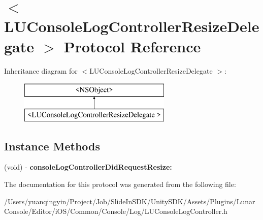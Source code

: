 \hypertarget{protocol_l_u_console_log_controller_resize_delegate_01-p}{}\section{$<$L\+U\+Console\+Log\+Controller\+Resize\+Delegate $>$ Protocol Reference}
\label{protocol_l_u_console_log_controller_resize_delegate_01-p}
Inheritance diagram for $<$L\+U\+Console\+Log\+Controller\+Resize\+Delegate $>$\+:\begin{figure}[H]
\begin{center}
\leavevmode
\includegraphics[height=2.000000cm]{protocol_l_u_console_log_controller_resize_delegate_01-p}
\end{center}
\end{figure}
\subsection*{Instance Methods}
\begin{DoxyCompactItemize}
\item 
\mbox{\label{protocol_l_u_console_log_controller_resize_delegate_01-p_a04c9af6ed81d6d43d8509cb3dae4eb29}} 
(void) -\/ {\bfseries console\+Log\+Controller\+Did\+Request\+Resize\+:}
\end{DoxyCompactItemize}


The documentation for this protocol was generated from the following file\+:\begin{DoxyCompactItemize}
\item 
/\+Users/yuanqingyin/\+Project/\+Job/\+Slide\+In\+S\+D\+K/\+Unity\+S\+D\+K/\+Assets/\+Plugins/\+Lunar\+Console/\+Editor/i\+O\+S/\+Common/\+Console/\+Log/L\+U\+Console\+Log\+Controller.\+h\end{DoxyCompactItemize}
